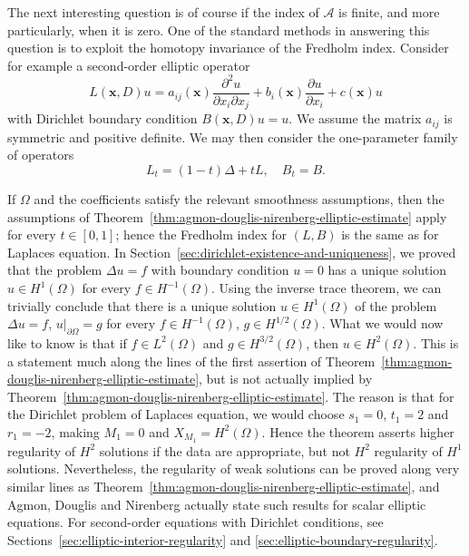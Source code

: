 The next interesting question is of course if the index of $\mathcal{A}$ is finite, and more particularly, when it is zero. One of the standard methods in answering this question is to exploit the homotopy invariance of the Fredholm index. Consider for example a second-order elliptic operator
\begin{equation}\label{eq:elliptic-dirichlet-index-homotopy-operator}
L(\bm{x},D)u=a_{ij}(\bm{x})\frac{\partial^2u}{\partial x_i\partial x_j}+b_i(\bm{x})\frac{\partial u}{\partial x_i}+c(\bm{x})u
\end{equation}
with Dirichlet boundary condition $B(\bm{x},D)u=u$. We assume the matrix $a_{ij}$ is symmetric and positive definite. We may then consider the one-parameter family of operators
\begin{equation}\label{eq:elliptic-dirichlet-laplace-homotopy}
L_t=(1-t)\Delta+tL,\quad B_t=B.
\end{equation}


If $\Omega$ and the coefficients satisfy the relevant smoothness assumptions, then the assumptions of Theorem~\ref{thm:agmon-douglis-nirenberg-elliptic-estimate} apply for every $t\in[0,1]$; hence the Fredholm index for $(L,B)$ is the same as for Laplace\textquotesingle s equation. In Section~\ref{sec:dirichlet-existence-and-uniqueness}, we proved that the problem $\Delta u=f$ with boundary condition $u=0$ has a unique solution $u\in H^1(\Omega)$ for every $f\in H^{-1}(\Omega)$. Using the inverse trace theorem, we can trivially conclude that there is a unique solution $u\in H^1(\Omega)$ of the problem $\Delta u=f$, $u|_{\partial\Omega}=g$ for every $f\in H^{-1}(\Omega)$, $g\in H^{1/2}(\Omega)$. What we would now like to know is that if $f\in L^2(\Omega)$ and $g\in H^{3/2}(\Omega)$, then $u\in H^2(\Omega)$. This is a statement much along the lines of the first assertion of Theorem~\ref{thm:agmon-douglis-nirenberg-elliptic-estimate}, but is not actually implied by Theorem~\ref{thm:agmon-douglis-nirenberg-elliptic-estimate}. The reason is that for the Dirichlet problem of Laplace\textquotesingle s equation, we would choose $s_1=0$, $t_1=2$ and $r_1=-2$, making $M_1=0$ and $X_{M_1}=H^2(\Omega)$. Hence the theorem asserts higher regularity of $H^2$ solutions if the data are appropriate, but not $H^2$ regularity of $H^1$ solutions. Nevertheless, the regularity of weak solutions can be proved along very similar lines as Theorem~\ref{thm:agmon-douglis-nirenberg-elliptic-estimate}, and Agmon, Douglis and Nirenberg actually state such results for scalar elliptic equations. For second-order equations with Dirichlet conditions, see Sections~\ref{sec:elliptic-interior-regularity} and \ref{sec:elliptic-boundary-regularity}.


